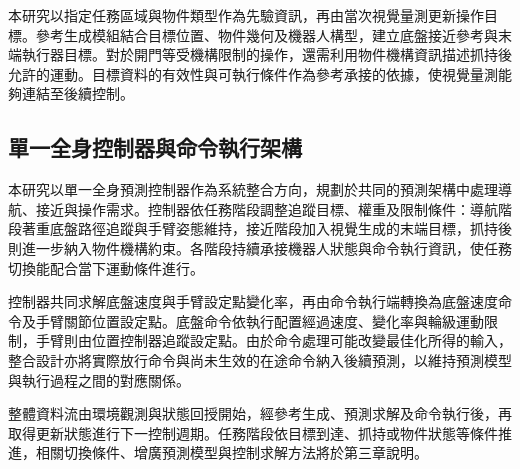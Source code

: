 本研究以指定任務區域與物件類型作為先驗資訊，再由當次視覺量測更新操作目標。參考生成模組結合目標位置、物件幾何及機器人構型，建立底盤接近參考與末端執行器目標。對於開門等受機構限制的操作，還需利用物件機構資訊描述抓持後允許的運動。目標資料的有效性與可執行條件作為參考承接的依據，使視覺量測能夠連結至後續控制。

\subsection{單一全身控制器與命令執行架構}
\label{subsec:wholebody_controller_execution}

本研究以單一全身預測控制器作為系統整合方向，規劃於共同的預測架構中處理導航、接近與操作需求。控制器依任務階段調整追蹤目標、權重及限制條件：導航階段著重底盤路徑追蹤與手臂姿態維持，接近階段加入視覺生成的末端目標，抓持後則進一步納入物件機構約束。各階段持續承接機器人狀態與命令執行資訊，使任務切換能配合當下運動條件進行。

控制器共同求解底盤速度與手臂設定點變化率，再由命令執行端轉換為底盤速度命令及手臂關節位置設定點。底盤命令依執行配置經過速度、變化率與輪級運動限制，手臂則由位置控制器追蹤設定點。由於命令處理可能改變最佳化所得的輸入，整合設計亦將實際放行命令與尚未生效的在途命令納入後續預測，以維持預測模型與執行過程之間的對應關係。

整體資料流由環境觀測與狀態回授開始，經參考生成、預測求解及命令執行後，再取得更新狀態進行下一控制週期。任務階段依目標到達、抓持或物件狀態等條件推進，相關切換條件、增廣預測模型與控制求解方法將於第三章說明。

